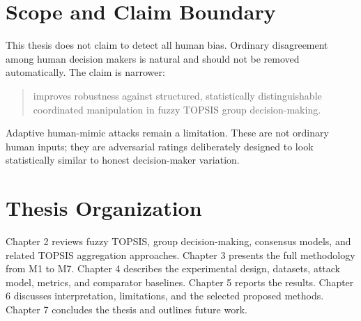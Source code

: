 \section{Scope and Claim Boundary}
This thesis does not claim to detect all human bias. Ordinary disagreement among human decision makers is natural and should not be removed automatically. The claim is narrower:

\begin{quote}
\methodname{} improves robustness against structured, statistically distinguishable coordinated manipulation in fuzzy TOPSIS group decision-making.
\end{quote}

Adaptive human-mimic attacks remain a limitation. These are not ordinary human inputs; they are adversarial ratings deliberately designed to look statistically similar to honest decision-maker variation.

\section{Thesis Organization}
Chapter 2 reviews fuzzy TOPSIS, group decision-making, consensus models, and related TOPSIS aggregation approaches. Chapter 3 presents the full methodology from M1 to M7. Chapter 4 describes the experimental design, datasets, attack model, metrics, and comparator baselines. Chapter 5 reports the results. Chapter 6 discusses interpretation, limitations, and the selected proposed methods. Chapter 7 concludes the thesis and outlines future work.
